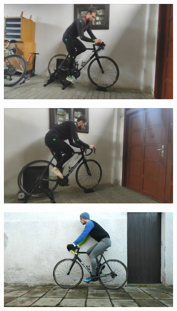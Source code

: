 \begin{figure}[htbp]
\begin{subfigure}[b]{\imgwidth}
        \includegraphics[width=1\linewidth]{obrazky-figures/6.png}
    \end{subfigure}
    \begin{subfigure}[b]{\imgwidth}
        \centering

        \includegraphics[width=1\linewidth]{obrazky-figures/7.png}

    \end{subfigure}
    \hfill
    \begin{subfigure}[b]{\imgwidth}
        \centering

        \includegraphics[width=1\linewidth]{obrazky-figures/8.png}


\end{subfigure}
\end{figure}
